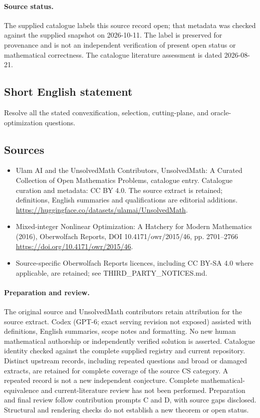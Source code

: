 \documentclass[11pt]{article}
\begin{document}
\paragraph{Source status.}
The supplied catalogue labels this source record open; that metadata was checked against the supplied snapshot on 2026-10-11. The label is preserved for provenance and is not an independent verification of present open status or mathematical correctness. The catalogue literature assessment is dated 2026-08-21.
\subsection{Short English statement}
Resolve all the stated convexification, selection, cutting-plane, and oracle-optimization questions.
\subsection{Sources}
\begin{itemize}
\item[\hypertarget{source:statement:1}{S1}] Ulam AI and the UnsolvedMath Contributors, UnsolvedMath: A Curated Collection of Open Mathematics Problems, catalogue entry. Catalogue curation and metadata: CC BY 4.0. The source extract is retained; definitions, English summaries and qualifications are editorial additions.
\url{https://huggingface.co/datasets/ulamai/UnsolvedMath}.
\item[\hypertarget{source:statement:2}{S2}] Mixed-integer Nonlinear Optimization: A Hatchery for Modern Mathematics (2016), Oberwolfach Reports, DOI 10.4171/owr/2015/46, pp. 2701--2766
\url{https://doi.org/10.4171/owr/2015/46}.
\item Source-specific Oberwolfach Reports licences, including CC BY-SA 4.0 where applicable, are retained; see THIRD\_PARTY\_NOTICES.md.
\end{itemize}
\paragraph{Preparation and review.}
The original source and UnsolvedMath contributors retain attribution for the source extract. Codex (GPT-6; exact serving revision not exposed) assisted with definitions, English summaries, scope notes and formatting. No new human mathematical authorship or independently verified solution is asserted. Catalogue identity checked against the complete supplied registry and current repository. Distinct upstream records, including repeated questions and broad or damaged extracts, are retained for complete coverage of the source CS category. A repeated record is not a new independent conjecture. Complete mathematical-equivalence and current-literature review has not been performed. Preparation and final review follow contribution prompts C and D, with source gaps disclosed. Structural and rendering checks do not establish a new theorem or open status.
\label{end:statement}
\end{document}
